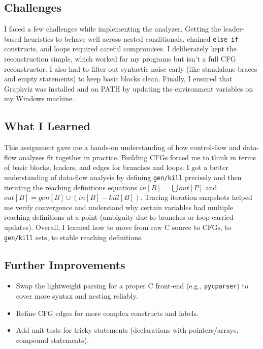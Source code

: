 \documentclass[10pt,a4paper]{report}
\begin{document}
\subsection{Challenges}
I faced a few challenges while implementing the analyzer. Getting the leader-based heuristics to behave well across nested conditionals, chained \texttt{else if} constructs, and loops required careful compromises. I deliberately kept the reconstruction simple, which worked for my programs but isn’t a full CFG reconstructor. I also had to filter out syntactic noise early (like standalone braces and empty statements) to keep basic blocks clean. Finally, I ensured that Graphviz was installed and on PATH by updating the environment variables on my Windows machine.

\subsection{What I Learned}
This assignment gave me a hands-on understanding of how control-flow and data-flow analyses fit together in practice. Building CFGs forced me to think in terms of basic blocks, leaders, and edges for branches and loops. I got a better understanding of data-flow analysis by defining \texttt{gen/kill} precisely and then iterating the reaching definitions equations $in[B] = \bigcup out[P]$ and $out[B] = gen[B] \cup (in[B] - kill[B])$. Tracing iteration snapshots helped me verify convergence and understand why certain variables had multiple reaching definitions at a point (ambiguity due to branches or loop-carried updates). Overall, I learned how to move from raw C source to CFGs, to \texttt{gen/kill} sets, to stable reaching definitions.

\subsection{Further Improvements}
\begin{itemize}[itemsep=0em, topsep=0pt]
    \item Swap the lightweight parsing for a proper C front-end (e.g., \texttt{pycparser}) to cover more syntax and nesting reliably.
    \item Refine CFG edges for more complex constructs and labels.
    \item Add unit tests for tricky statements (declarations with pointers/arrays, compound statements).
\end{itemize}

\newpage
\end{document}
